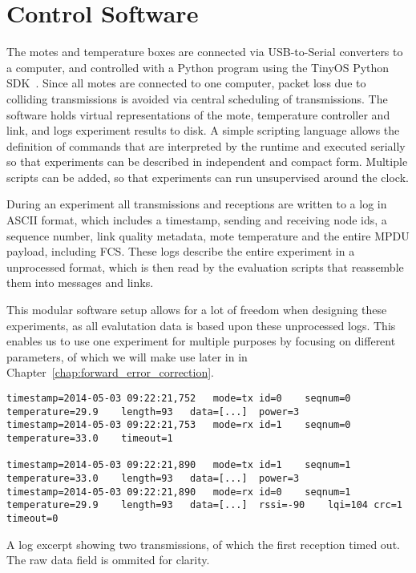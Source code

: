 \section{Control Software}
\label{sec:control_software}

The motes and temperature boxes are connected via USB-to-Serial converters to a computer, and controlled with a Python program using the TinyOS Python SDK~\cite{tinyos.net}.
Since all motes are connected to one computer, packet loss due to colliding transmissions is avoided via central scheduling of transmissions.
The software holds virtual representations of the mote, temperature controller and link, and logs experiment results to disk.
A simple scripting language allows the definition of commands that are interpreted by the runtime and executed serially so that experiments can be described in independent and compact form.
Multiple scripts can be added, so that experiments can run unsupervised around the clock.

During an experiment all transmissions and receptions are written to a log in ASCII format, which includes a timestamp, sending and receiving node ids, a sequence number, link quality metadata, mote temperature and the entire \ac{MPDU} payload, including \ac{FCS}.%
These logs describe the entire experiment in a unprocessed format, which is then read by the evaluation scripts that reassemble them into messages and links.

This modular software setup allows for a lot of freedom when designing these experiments, as all evalutation data is based upon these unprocessed logs.
This enables us to use one experiment for multiple purposes by focusing on different parameters, of which we will make use later in in Chapter~\ref{chap:forward_error_correction}.

\begin{listing}[t]
\begin{lstlisting}[breaklines=true]
timestamp=2014-05-03 09:22:21,752	mode=tx	id=0	seqnum=0	temperature=29.9	length=93	data=[...]	power=3
timestamp=2014-05-03 09:22:21,753	mode=rx	id=1	seqnum=0	temperature=33.0	timeout=1

timestamp=2014-05-03 09:22:21,890	mode=tx	id=1	seqnum=1	temperature=33.0	length=93	data=[...]	power=3
timestamp=2014-05-03 09:22:21,890	mode=rx	id=0	seqnum=1	temperature=29.9	length=93	data=[...]	rssi=-90	lqi=104 crc=1 timeout=0
\end{lstlisting}
\caption{A log excerpt showing two transmissions, of which the first reception timed out. The raw data field is ommited for clarity.}
\label{lst:log_example}
\end{listing}
